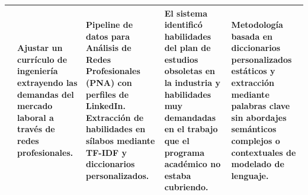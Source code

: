 \begin{landscape}
\begin{xltabular}{\linewidth}{p{2.2cm} X X X X}
    \citep{constantinov_preliminary_2015} & 
    Ajustar un currículo de ingeniería extrayendo las demandas del mercado laboral a través de redes profesionales. & 
    Pipeline de datos para Análisis de Redes Profesionales (PNA) con perfiles de LinkedIn. Extracción de habilidades en sílabos mediante TF-IDF y diccionarios personalizados. & 
    El sistema identificó habilidades del plan de estudios obsoletas en la industria y habilidades muy demandadas en el trabajo que el programa académico no estaba cubriendo. & 
    Metodología basada en diccionarios personalizados estáticos y extracción mediante palabras clave sin abordajes semánticos complejos o contextuales de modelado de lenguaje. \\
  
    \bottomrule
\end{xltabular}
\end{landscape}




